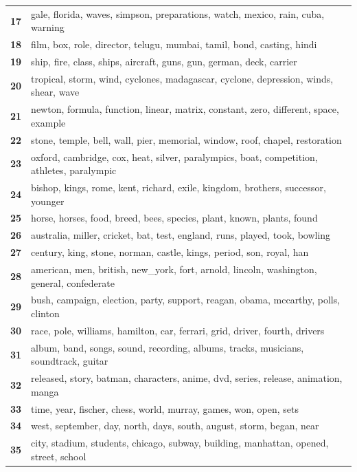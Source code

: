 \begin{table}[htpb]
\begin{tabularx}{\textwidth}{@{}l X@{}}
        \textbf{17} & gale, florida, waves, simpson, preparations, watch, mexico, rain, cuba, warning \\
        \textbf{18} & film, box, role, director, telugu, mumbai, tamil, bond, casting, hindi \\
        \textbf{19} & ship, fire, class, ships, aircraft, guns, gun, german, deck, carrier \\
        \textbf{20} & tropical, storm, wind, cyclones, madagascar, cyclone, depression, winds, shear, wave \\
        \textbf{21} & newton, formula, function, linear, matrix, constant, zero, different, space, example \\
        \textbf{22} & stone, temple, bell, wall, pier, memorial, window, roof, chapel, restoration \\
        \textbf{23} & oxford, cambridge, cox, heat, silver, paralympics, boat, competition, athletes, paralympic \\
        \textbf{24} & bishop, kings, rome, kent, richard, exile, kingdom, brothers, successor, younger \\
        \textbf{25} & horse, horses, food, breed, bees, species, plant, known, plants, found \\
        \textbf{26} & australia, miller, cricket, bat, test, england, runs, played, took, bowling \\
        \textbf{27} & century, king, stone, norman, castle, kings, period, son, royal, han \\
        \textbf{28} & american, men, british, new\_york, fort, arnold, lincoln, washington, general, confederate \\
        \textbf{29} & bush, campaign, election, party, support, reagan, obama, mccarthy, polls, clinton \\
        \textbf{30} & race, pole, williams, hamilton, car, ferrari, grid, driver, fourth, drivers \\
        \textbf{31} & album, band, songs, sound, recording, albums, tracks, musicians, soundtrack, guitar \\
        \textbf{32} & released, story, batman, characters, anime, dvd, series, release, animation, manga \\
        \textbf{33} & time, year, fischer, chess, world, murray, games, won, open, sets \\
        \textbf{34} & west, september, day, north, days, south, august, storm, began, near \\
        \textbf{35} & city, stadium, students, chicago, subway, building, manhattan, opened, street, school \\

\end{tabularx}
\end{table}
